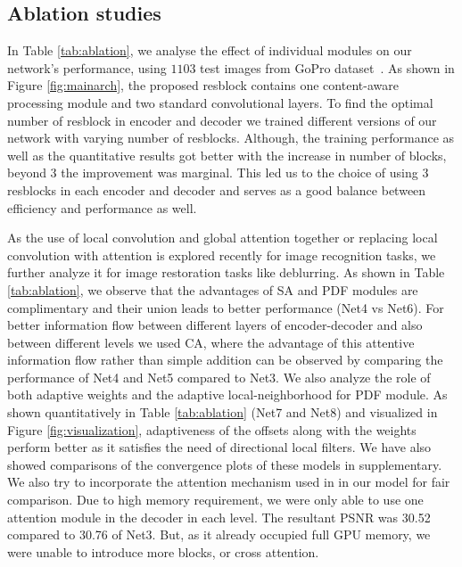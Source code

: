\documentclass[10pt,twocolumn,letterpaper]{article}
\begin{document}
\subsection{Ablation studies}
In Table \ref{tab:ablation}, we analyse the effect of individual modules on our network's performance, using $1103$ test images from GoPro dataset~\cite{nah2017deep}. As shown in Figure \ref{fig:mainarch}, the proposed resblock contains one content-aware processing module and two standard convolutional layers. To find the optimal number of resblock in encoder and decoder we trained different versions of our network with varying number of resblocks. Although, the training performance as well as the quantitative results got better with the increase in number of blocks, beyond 3 the improvement was marginal. This led us to the choice of using 3 resblocks in each encoder and decoder and serves as a good balance between efficiency and performance as well.


As the use of local convolution and global attention together \cite{bello2019attention} or replacing local convolution with attention \cite{ramachandran2019stand} is explored recently for image recognition tasks, we further analyze it for image restoration tasks like deblurring. As shown in Table \ref{tab:ablation}, we observe that the advantages of SA and PDF modules are complimentary and their union leads to better performance (Net4 vs Net6). For better information flow between different layers of encoder-decoder and also between different levels we used CA, where the advantage of this attentive information flow rather than simple addition can be observed by comparing the performance of Net4 and Net5 compared to Net3. We also analyze the role of both adaptive weights and the adaptive local-neighborhood for PDF module. As shown quantitatively in Table \ref{tab:ablation} (Net7 and Net8) and visualized in Figure \ref{fig:visualization}, adaptiveness of the offsets along with the weights perform better as it satisfies the need of directional local filters. We have also showed comparisons of the convergence plots of these models in supplementary. We also try to incorporate the attention mechanism used in \cite{bello2019attention} in our model for fair comparison. Due to high memory requirement, we were only able to use one attention module in the decoder in each level. The resultant PSNR was 30.52 compared to 30.76 of Net3. But, as it already occupied full GPU memory, we were unable to introduce more blocks, or cross attention.
\end{document}
